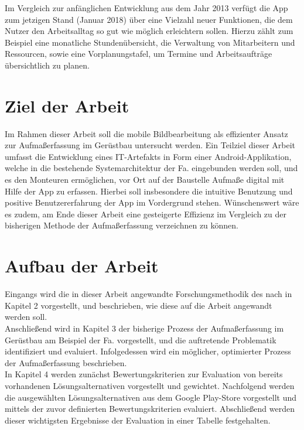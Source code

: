 Im Vergleich zur anfänglichen Entwicklung aus dem Jahr 2013 verfügt die App zum jetzigen Stand (Januar 2018) über eine Vielzahl neuer Funktionen, die dem Nutzer den Arbeitsalltag so gut wie möglich erleichtern sollen.
Hierzu zählt zum Beispiel eine monatliche Stundenübersicht, die Verwaltung von Mitarbeitern und Ressourcen, sowie eine Vorplanungstafel, um Termine und Arbeitsaufträge übersichtlich zu planen.

\section{Ziel der Arbeit}
Im Rahmen dieser Arbeit soll die mobile Bildbearbeitung als effizienter Ansatz zur Aufmaßerfassung im Gerüstbau untersucht werden.
Ein Teilziel dieser Arbeit umfasst die Entwicklung eines IT-Artefakts in Form einer Android-Applikation, welche in die bestehende Systemarchitektur der Fa. \vr{} eingebunden werden soll, und es den Monteuren ermöglichen, vor Ort auf der Baustelle Aufmaße digital mit Hilfe der App zu erfassen.
Hierbei soll insbesondere die intuitive Benutzung und positive Benutzererfahrung der App im Vordergrund stehen.
Wünschenswert wäre es zudem, am Ende dieser Arbeit eine gesteigerte Effizienz im Vergleich zu der bisherigen Methode der Aufmaßerfassung verzeichnen zu können.

\section{Aufbau der Arbeit}
Eingangs wird die in dieser Arbeit angewandte Forschungsmethodik des \hcdp{} nach \citeauthor{Norman13} in Kapitel 2 vorgestellt, und beschrieben, wie diese auf die Arbeit angewandt werden soll. \\

Anschließend wird in Kapitel 3 der bisherige Prozess der Aufmaßerfassung im Gerüstbau am Beispiel der Fa. \vr{} vorgestellt, und die auftretende Problematik identifiziert und evaluiert. 
Infolgedessen wird ein möglicher, optimierter Prozess der Aufmaßerfassung beschrieben. \\

In Kapitel 4 werden zunächst Bewertungskriterien zur Evaluation von bereits vorhandenen Lösungsalternativen vorgestellt und gewichtet.
Nachfolgend werden die ausgewählten Lösungsalternativen aus dem Google Play-Store vorgestellt und mittels der zuvor definierten Bewertungskriterien evaluiert.
Abschließend werden dieser wichtigsten Ergebnisse der Evaluation in einer Tabelle festgehalten. \\

